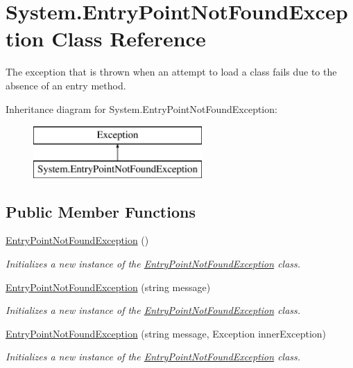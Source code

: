 \hypertarget{class_system_1_1_entry_point_not_found_exception}{}\section{System.\+Entry\+Point\+Not\+Found\+Exception Class Reference}
\label{class_system_1_1_entry_point_not_found_exception}


The exception that is thrown when an attempt to load a class fails due to the absence of an entry method.  


Inheritance diagram for System.\+Entry\+Point\+Not\+Found\+Exception\+:\begin{figure}[H]
\begin{center}
\leavevmode
\includegraphics[height=2.000000cm]{class_system_1_1_entry_point_not_found_exception}
\end{center}
\end{figure}
\subsection*{Public Member Functions}
\begin{DoxyCompactItemize}
\item 
\mbox{\hyperlink{class_system_1_1_entry_point_not_found_exception_a535242a8f320d40eb79eb5e7762508df}{Entry\+Point\+Not\+Found\+Exception}} ()
\begin{DoxyCompactList}\small\item\em Initializes a new instance of the \mbox{\hyperlink{class_system_1_1_entry_point_not_found_exception}{Entry\+Point\+Not\+Found\+Exception}} class. \end{DoxyCompactList}\item 
\mbox{\hyperlink{class_system_1_1_entry_point_not_found_exception_a825c6ef95a46adc36eea896ab51479e4}{Entry\+Point\+Not\+Found\+Exception}} (string message)
\begin{DoxyCompactList}\small\item\em Initializes a new instance of the \mbox{\hyperlink{class_system_1_1_entry_point_not_found_exception}{Entry\+Point\+Not\+Found\+Exception}} class. \end{DoxyCompactList}\item 
\mbox{\hyperlink{class_system_1_1_entry_point_not_found_exception_a2b5bb2820c3b5123fb1846ac390bdc2a}{Entry\+Point\+Not\+Found\+Exception}} (string message, Exception inner\+Exception)
\begin{DoxyCompactList}\small\item\em Initializes a new instance of the \mbox{\hyperlink{class_system_1_1_entry_point_not_found_exception}{Entry\+Point\+Not\+Found\+Exception}} class. \end{DoxyCompactList}\end{DoxyCompactItemize}



